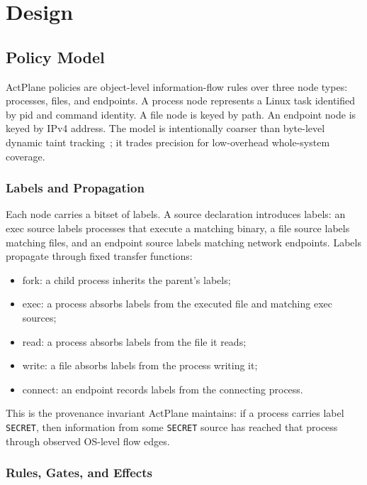 \section{Design}
\label{sec:design}

\subsection{Policy Model}

ActPlane policies are object-level information-flow rules over three node
types: processes, files, and endpoints. A process node represents a Linux task
identified by pid and command identity. A file node is keyed by path.
An endpoint node is keyed by IPv4 address. The model is intentionally
coarser than byte-level dynamic taint tracking~\cite{kemerlis2012libdft}; it
trades precision for low-overhead whole-system coverage.

\subsubsection{Labels and Propagation}

Each node carries a bitset of labels. A source declaration introduces labels:
an exec source labels processes that execute a matching binary, a file source
labels matching files, and an endpoint source labels matching network
endpoints. Labels propagate through fixed transfer functions:

\begin{itemize}
\item fork: a child process inherits the parent's labels;
\item exec: a process absorbs labels from the executed file and matching exec
sources;
\item read: a process absorbs labels from the file it reads;
\item write: a file absorbs labels from the process writing it;
\item connect: an endpoint records labels from the connecting process.
\end{itemize}

This is the provenance invariant ActPlane maintains: if a process carries label
\texttt{SECRET}, then information from some \texttt{SECRET} source has reached
that process through observed OS-level flow edges.

\subsubsection{Rules, Gates, and Effects}

